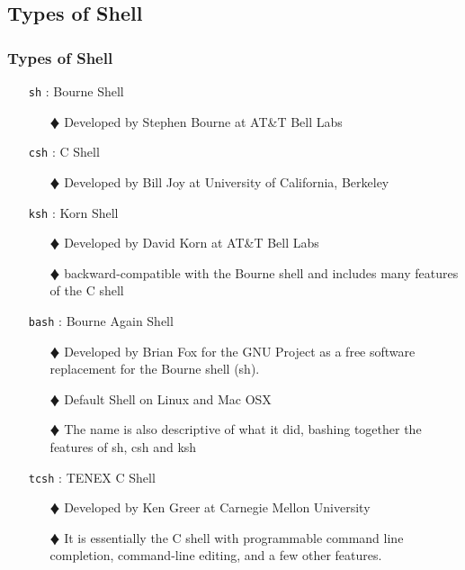 \documentclass[10pt,t]{beamer}
\begin{document}
\subsection{Types of Shell} 
\begin{frame}
  \frametitle{Types of Shell}
  \begin{itemize}
    \item[\texttt{sh}]: Bourne Shell
      \begin{enumerate}
      \item[$\vardiamond$] Developed by Stephen Bourne at AT\&T Bell Labs
      \end{enumerate}
    \item[\texttt{csh}]: C Shell
      \begin{enumerate}
      \item[$\vardiamond$] Developed by Bill Joy at University of California, Berkeley
      \end{enumerate}
    \item[\texttt{ksh}]: Korn Shell
      \begin{enumerate}
      \item[$\vardiamond$] Developed by David Korn at AT\&T Bell Labs
      \item[$\vardiamond$] backward-compatible with the Bourne shell and includes many features of the C shell
      \end{enumerate}
    \item[\texttt{bash}]: Bourne Again Shell
      \begin{enumerate}
      \item[$\vardiamond$] Developed by Brian Fox for the GNU Project as a free software replacement for the Bourne shell (sh).
      \item[$\vardiamond$] Default Shell on Linux and Mac OSX
      \item[$\vardiamond$] The name is also descriptive of what it did, bashing together the features of sh, csh and ksh
      \end{enumerate}
    \item[\texttt{tcsh}]: TENEX C Shell
      \begin{enumerate}
      \item[$\vardiamond$] Developed by Ken Greer at Carnegie Mellon University 
      \item[$\vardiamond$] It is essentially the C shell with programmable command line completion, command-line editing, and a few other features.
      \end{enumerate}
  \end{itemize}
\end{frame}
\end{document}
